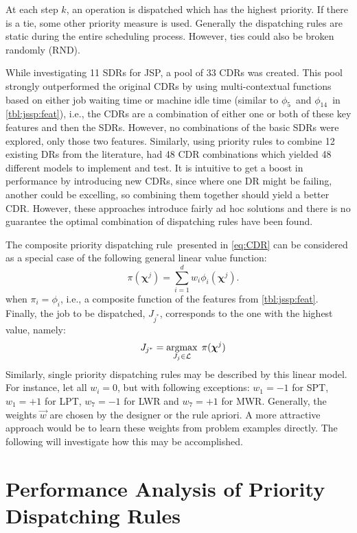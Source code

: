 \documentclass[twocolumn]{svjour3}
\newcommand{\vchi}{\bm \chi}
\newcommand{\argmax}{\mathop{\rm argmax}}
\newcommand{\dr}{dispatching rule}
\newcommand{\cdr}{composite priority \dr}
\newcommand{\sdr}{single priority \dr}
\newcommand{\phiwait}{$\phi_5$}
\newcommand{\phimacSlack}{$\phi_{14}$}
\begin{document}
At each step $k$, an operation is dispatched which has the highest 
priority. If there is a tie, some other priority measure is used. Generally 
the \dr s are static during the entire scheduling process. However, ties could 
also be broken randomly (RND). 

While investigating 11 SDRs for JSP, \cite{Lu13} a pool of 33 CDRs was created. 
This pool strongly outperformed the original CDRs by using multi-contextual 
functions based on either job waiting time or machine idle time (similar 
to \phiwait\ and \phimacSlack\ in \cref{tbl:jssp:feat}), i.e., the CDRs are a 
combination of either one or both of these key features and then the SDRs.
However, no combinations of the basic SDRs were explored, only those two 
features. 
Similarly, using priority rules to combine 12 existing DRs from the literature, 
\cite{Yu13} had 48 CDR combinations which yielded 48 different models 
to implement and test. 
It is intuitive to get a boost in performance by introducing new CDRs, since 
where one DR might be failing, another could be excelling, so combining them 
together should yield a better CDR. However, these approaches introduce fairly 
ad hoc solutions and there is no guarantee the optimal combination of 
\dr s have been found.

The \cdr\ presented in \cref{eq:CDR} can be considered as a special case of 
the following general linear value function:
\begin{equation}\quad\label{eq:jssp:linweights}
\pi(\vchi^j)=\sum_{i=1}^d w_i \phi_i(\vchi^j).
\end{equation}
when $\pi_i=\phi_i$, i.e., a composite function of the features 
from \cref{tbl:jssp:feat}. Finally, the job to be dispatched, $J_{j^*}$, 
corresponds to the one with the highest value, namely:
\begin{equation}\quad\label{eq:jstar}
J_{j^*}=\argmax_{J_j\in \mathcal{L}}\; \pi(\vchi^j)
\end{equation}
Similarly, \sdr s may be described by this linear model. For instance, let all 
$w_i=0$, but with following exceptions: $w_1=-1$ for SPT, $w_1=+1$ for LPT, 
$w_7=-1$ for LWR and $w_7=+1$ for MWR. Generally, the weights $\vec{w}$ are 
chosen by the designer or the 
rule apriori. A more attractive approach would be to learn these weights from 
problem examples directly. The following  will  
investigate how this may be accomplished.

\section{Performance Analysis of Priority Dispatching Rules}\label{sec:learnOPT}
\end{document}
